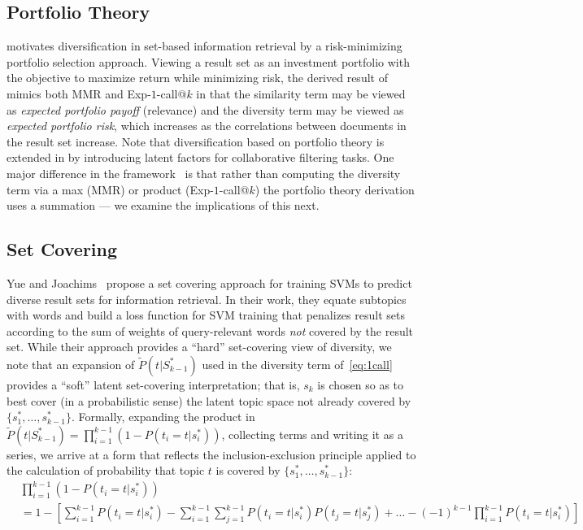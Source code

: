 \subsection{Portfolio Theory}
\cite{wang09PortfolioTheory} motivates
diversification in set-based information retrieval by a
risk-minimizing portfolio selection approach.  Viewing a result set as
an investment portfolio with the objective to maximize return while
minimizing risk, the derived result of~\cite{wang09PortfolioTheory}
mimics both MMR and Exp-$1$-call@$k$ in that the similarity term may
be viewed as \emph{expected portfolio payoff} (relevance) and the
diversity term may be viewed as \emph{expected portfolio risk}, which
increases as the correlations between documents in the result set
increase. 
Note that diversification based on portfolio theory is
extended in \cite{Shi:SIGIR2012} by introducing latent factors for
collaborative filtering tasks. One major difference in the
framework~\cite{wang09PortfolioTheory} is that rather than computing
the diversity term via a max (MMR) or product (Exp-$1$-call@$k$) the
portfolio theory derivation uses a summation --- we examine the
implications of this next.

\subsection{Set Covering}
Yue and Joachims~\cite{yue081224Predicting} propose a set covering
approach for training SVMs to predict diverse result sets for
information retrieval.  In their work, they equate subtopics with
words and build a loss function for SVM training that penalizes result
sets according to the sum of weights of query-relevant words
\emph{not} covered by the result set.  While their approach provides a
``hard'' set-covering view of diversity, we note that an expansion of
$\tilde{P}(t | S_{k-1}^*)$ used in the diversity term
of~\eqref{eq:1call} provides a ``soft'' latent set-covering
interpretation; that is, $s_k$ is chosen so as to best cover (in a
probabilistic sense) the latent topic space not already covered by $\{
s_1^*,\ldots,s_{k-1}^* \}$.  Formally, expanding the product in
$\tilde{P}(t | S_{k-1}^*) = \prod_{i=1}^{k-1} \left(1 -
P(t_{i}=t|s_{i}^{*})\right)$, collecting terms and writing it as a
series, we arrive at a form that reflects the inclusion-exclusion
principle applied to the calculation of probability that topic $t$ is
covered by $\{ s_1^*,\ldots,s_{k-1}^* \}$:
\begin{align}
& \prod_{i=1}^{k-1} \left(1 - P(t_{i}=t|s_{i}^{*})\right) \nonumber \\
& = 1 - \left[ \sum_{i=1}^{k-1} P(t_{i}= t|s_{i}^{*}) - \sum_{i=1}^{k-1}\sum_{j=1}^{k-1}P(t_{i}= t|s_{i}^{*})P(t_{j}= t|s_{j}^{*}) + \dots - (-1)^{k-1}\prod_{i=1}^{k-1}P(t_{i}=t|s_{i}^{*})\right] \label{eq:setcover}
\end{align}

